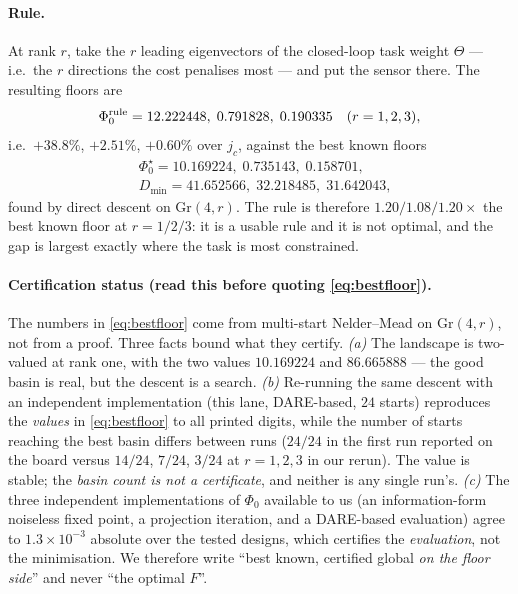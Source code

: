 \documentclass[journal]{IEEEtran}
\theoremstyle{remark}
\begin{document}
\paragraph{Rule.} At rank $r$, take the $r$ leading eigenvectors of the
closed-loop task weight $\Theta$ --- i.e.\ the $r$ directions the cost penalises
most --- and put the sensor there. The resulting floors are
\begin{equation}
  \Phi_0^{\rm rule}=12.222448,\;0.791828,\;0.190335
  \quad(r=1,2,3),
  \label{eq:rule}
\end{equation}
i.e.\ $+38.8\%$, $+2.51\%$, $+0.60\%$ over $j_c$, against the best known floors
\begin{equation}
  \begin{aligned}
  &\Phi_0^{\star}=10.169224,\;0.735143,\;0.158701,\\
  &D_{\min}=41.652566,\;32.218485,\;31.642043,
  \end{aligned}
  \label{eq:bestfloor}
\end{equation}
found by direct descent on $\mathrm{Gr}(4,r)$. The rule is therefore
$1.20/1.08/1.20\times$ the best known floor at $r=1/2/3$: it is a usable rule and
it is not optimal, and the gap is largest exactly where the task is most
constrained.

\paragraph{Certification status (read this before quoting \eqref{eq:bestfloor}).}
The numbers in \eqref{eq:bestfloor} come from multi-start Nelder--Mead on
$\mathrm{Gr}(4,r)$, not from a proof. Three facts bound what they certify.
\emph{(a)} The landscape is two-valued at rank one, with the two values
$10.169224$ and $86.665888$ --- the good basin is real, but the descent is a
search.
\emph{(b)} Re-running the same descent with an independent implementation (this
lane, DARE-based, $24$ starts) reproduces the \emph{values} in
\eqref{eq:bestfloor} to all printed digits, while the number of starts reaching
the best basin differs between runs ($24/24$ in the first run reported on the
board versus $14/24$, $7/24$, $3/24$ at $r=1,2,3$ in our rerun). The value is
stable; the \emph{basin count is not a certificate}, and neither is any single
run's.
\emph{(c)} The three independent implementations of $\Phi_0$ available to us
(an information-form noiseless fixed point, a projection iteration, and a
DARE-based evaluation) agree to $1.3\times10^{-3}$ absolute over the tested
designs, which certifies the \emph{evaluation}, not the minimisation.
We therefore write ``best known, certified global \emph{on the floor side}'' and
never ``the optimal $F$''.
\end{document}
